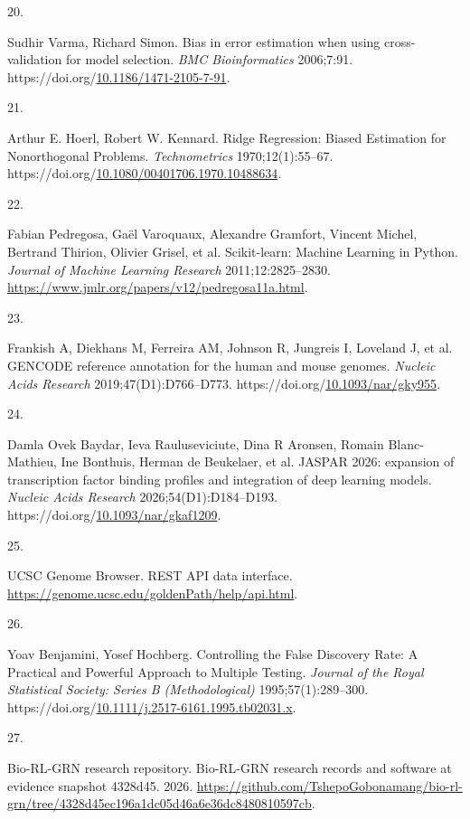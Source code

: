 \documentclass[
  11pt,
]{article}
\newlength{\cslhangindent}
\newlength{\csllabelwidth}
\newenvironment{CSLReferences}[2] %
 {\begin{list}{}{%
  \setlength{\itemindent}{0pt}
  \setlength{\leftmargin}{0pt}
  \setlength{\parsep}{0pt}
  \ifodd #1
   \setlength{\leftmargin}{\cslhangindent}
   \setlength{\itemindent}{-1\cslhangindent}
  \fi
  \setlength{\itemsep}{#2\baselineskip}}}
 {\end{list}}
\newcommand{\CSLLeftMargin}[1]{\parbox[t]{\csllabelwidth}{\strut#1\strut}}
\newcommand{\CSLRightInline}[1]{\parbox[t]{\linewidth - \csllabelwidth}{\strut#1\strut}}
\begin{document}
\begin{CSLReferences}{0}{1}
\CSLLeftMargin{20. }%
\CSLRightInline{Sudhir Varma, Richard Simon. Bias in error estimation
when using cross-validation for model selection. \emph{BMC
Bioinformatics} 2006;7:91.
https://doi.org/\href{https://doi.org/10.1186/1471-2105-7-91}{10.1186/1471-2105-7-91}.}

\CSLLeftMargin{21. }%
\CSLRightInline{Arthur E. Hoerl, Robert W. Kennard. Ridge Regression:
Biased Estimation for Nonorthogonal Problems. \emph{Technometrics}
1970;12(1):55--67.
https://doi.org/\href{https://doi.org/10.1080/00401706.1970.10488634}{10.1080/00401706.1970.10488634}.}

\CSLLeftMargin{22. }%
\CSLRightInline{Fabian Pedregosa, Gaël Varoquaux, Alexandre Gramfort,
Vincent Michel, Bertrand Thirion, Olivier Grisel, et al. Scikit-learn:
Machine Learning in Python. \emph{Journal of Machine Learning Research}
2011;12:2825--2830.
\url{https://www.jmlr.org/papers/v12/pedregosa11a.html}.}

\CSLLeftMargin{23. }%
\CSLRightInline{Frankish A, Diekhans M, Ferreira AM, Johnson R, Jungreis
I, Loveland J, et al. GENCODE reference annotation for the human and
mouse genomes. \emph{Nucleic Acids Research} 2019;47(D1):D766--D773.
https://doi.org/\href{https://doi.org/10.1093/nar/gky955}{10.1093/nar/gky955}.}

\CSLLeftMargin{24. }%
\CSLRightInline{Damla Ovek Baydar, Ieva Rauluseviciute, Dina R Aronsen,
Romain Blanc-Mathieu, Ine Bonthuis, Herman de Beukelaer, et al. JASPAR
2026: expansion of transcription factor binding profiles and integration
of deep learning models. \emph{Nucleic Acids Research}
2026;54(D1):D184--D193.
https://doi.org/\href{https://doi.org/10.1093/nar/gkaf1209}{10.1093/nar/gkaf1209}.}

\CSLLeftMargin{25. }%
\CSLRightInline{UCSC Genome Browser. REST API data interface.
\url{https://genome.ucsc.edu/goldenPath/help/api.html}.}

\CSLLeftMargin{26. }%
\CSLRightInline{Yoav Benjamini, Yosef Hochberg. Controlling the False
Discovery Rate: A Practical and Powerful Approach to Multiple Testing.
\emph{Journal of the Royal Statistical Society: Series B
(Methodological)} 1995;57(1):289--300.
https://doi.org/\href{https://doi.org/10.1111/j.2517-6161.1995.tb02031.x}{10.1111/j.2517-6161.1995.tb02031.x}.}

\CSLLeftMargin{27. }%
\CSLRightInline{Bio-RL-GRN research repository. Bio-RL-GRN research
records and software at evidence snapshot 4328d45. 2026.
\url{https://github.com/TshepoGobonamang/bio-rl-grn/tree/4328d45ec196a1dc05d46a6e36dc8480810597cb}.}

\end{CSLReferences}
\end{document}
